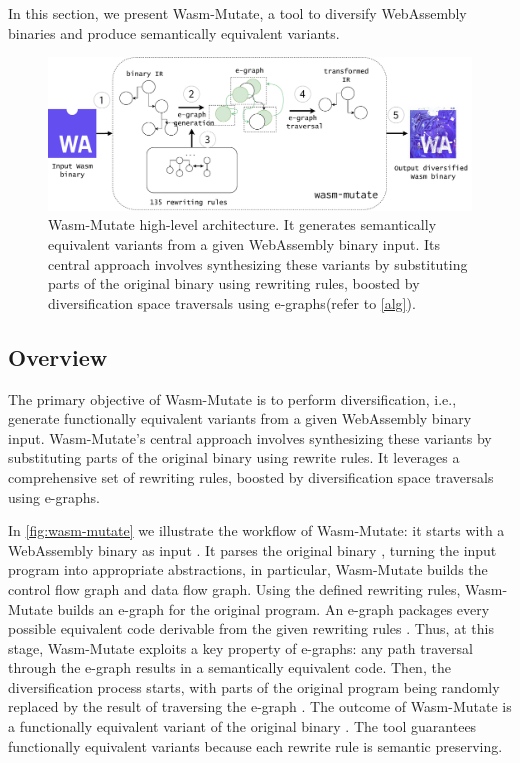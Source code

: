 \documentclass[a4paper,fleqn]{cas-dc}
\newcommand{\tool}{{\sc Wasm-Mutate}\xspace}
\newcommand*\step[1]{
\noindent\tikz[baseline=(char.base)]{
        \node[shape=circle,text=black,draw=black, fill=white,inner sep=1.2pt] (char) {#1};}}
\begin{document}
In this section, we present \tool, a tool to diversify
WebAssembly binaries and produce semantically equivalent variants.
\begin{figure}[h!]
    \centering
    \includegraphics[width=0.9\linewidth]{figures/workflow.v2.pdf}
    \caption{ \tool high-level architecture.  It generates semantically equivalent variants from a given WebAssembly binary input. 
    Its central approach involves synthesizing these variants by substituting parts of the original binary using rewriting rules, boosted by diversification space traversals using e-graphs(refer to \autoref{alg}).}
  \label{fig:wasm-mutate}
\end{figure}


\subsection{Overview}
The primary objective of \tool is to perform diversification, i.e., generate functionally equivalent variants from a given WebAssembly binary input. 
\tool's central approach involves synthesizing these variants by substituting parts of the original binary using rewrite rules. 
It leverages a comprehensive set of rewriting rules, boosted by diversification space traversals using e-graphs.


In \autoref{fig:wasm-mutate} we illustrate the workflow of \tool: it starts with a WebAssembly binary as input \step{1}.
It parses the original binary \step{2}, turning the input program into appropriate abstractions, in particular, \tool builds the control flow graph and data flow graph. 
Using the defined rewriting rules, \tool builds an e-graph \step{3} for the original program.
An e-graph packages every possible equivalent code derivable from the given rewriting rules  \cite{10.1145/3434304, 10.1145/3385412.3386001}.
Thus, at this stage, \tool exploits a key property of e-graphs:
any path traversal through the e-graph results in a semantically equivalent code.
Then, the diversification process starts, with parts of the original program being randomly replaced by the result of traversing the e-graph \step{4}.
The outcome of \tool is a functionally equivalent variant of the original binary \step{5}.
The tool guarantees functionally equivalent variants because each rewrite rule is semantic preserving.
\end{document}
